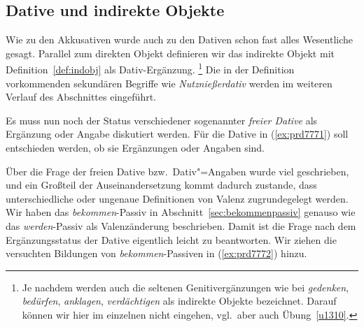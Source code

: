 \subsection{Dative und indirekte Objekte}

\label{sec:dativobjekte}

Wie zu den Akkusativen wurde auch zu den Dativen schon fast alles Wesentliche gesagt.
Parallel zum direkten Objekt definieren wir das indirekte Objekt mit Definition~\ref{def:indobj} als Dativ-Ergänzung.%
\footnote{Je nachdem werden auch die seltenen Genitivergänzungen wie bei \textit{gedenken}, \textit{bedürfen}, \textit{anklagen}, \textit{verdächtigen} als indirekte Objekte bezeichnet.
Darauf können wir hier im einzelnen nicht eingehen, vgl.\ aber auch Übung~\ref{u1310}.}
Die in der Definition vorkommenden sekundären Begriffe wie \textit{Nutznießerdativ} werden im weiteren Verlauf des Abschnittes eingeführt.


Es muss nun noch der Status verschiedener sogenannter \textit{freier Dative} als Ergänzung oder Angabe diskutiert werden.
Für die Dative in (\ref{ex:prd7771}) soll entschieden werden, ob sie Ergänzungen oder Angaben sind.

\begin{exe}
  \ex\label{ex:prd7771} 
  \begin{xlist}
  \end{xlist}
\end{exe}


Über die Frage der freien Dative bzw.\ Dativ"=Angaben wurde viel geschrieben, und ein Großteil der Auseinandersetzung kommt dadurch zustande, dass unterschiedliche oder ungenaue Definitionen von Valenz zugrundegelegt werden.
Wir haben das \textit{bekommen}-Passiv in Abschnitt~\ref{sec:bekommenpassiv} genauso wie das \textit{werden}-Passiv als Valenzänderung beschrieben.
Damit ist die Frage nach dem Ergänzungsstatus der Dative eigentlich leicht zu beantworten.
Wir ziehen die versuchten Bildungen von \textit{bekommen}-Passiven in (\ref{ex:prd7772}) hinzu.

